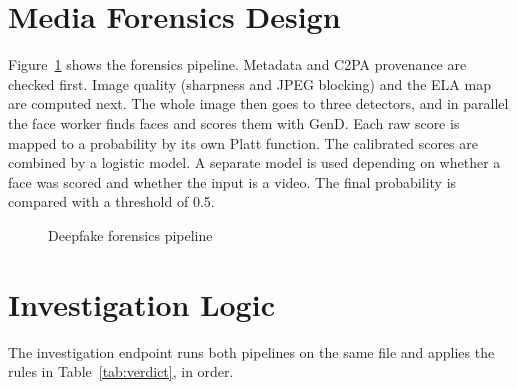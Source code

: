 \documentclass[12pt,a4paper,oneside]{report}
\begin{document}
\section{Media Forensics Design}
Figure~\ref{fig:pipeline} shows the forensics pipeline. Metadata and C2PA provenance are checked first. Image quality (sharpness and JPEG blocking) and the ELA map are computed next. The whole image then goes to three detectors, and in parallel the face worker finds faces and scores them with GenD. Each raw score is mapped to a probability by its own Platt function. The calibrated scores are combined by a logistic model. A separate model is used depending on whether a face was scored and whether the input is a video. The final probability is compared with a threshold of 0.5.

\begin{figure}[H]
\centering
{}
\caption{Deepfake forensics pipeline}\label{fig:pipeline}
\end{figure}

\section{Investigation Logic}
The investigation endpoint runs both pipelines on the same file and applies the rules in Table~\ref{tab:verdict}, in order.
\end{document}
